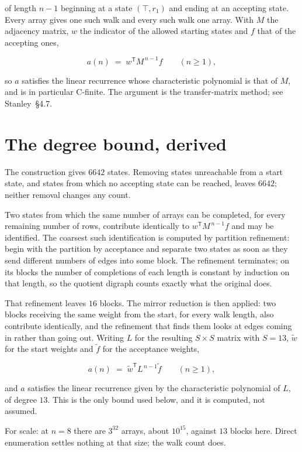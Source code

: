 \documentclass[11pt]{article}
\theoremstyle{definition}
\begin{document}
of length $n-1$ beginning at a state $(\top,r_1)$ and ending at an accepting state. Every array gives one such walk and every such walk one array. With $M$ the adjacency matrix, $w$ the indicator of the allowed starting states and $f$ that of the accepting ones,

\[a(n) \;=\; w^{\mathsf T} M^{\,n-1} f \qquad (n \ge 1),\]

so $a$ satisfies the linear recurrence whose characteristic polynomial is that of $M$, and is in particular C-finite. The argument is the transfer-matrix method; see Stanley~\S4.7.

\section{The degree bound, derived}

The construction gives $6642$ states. Removing states unreachable from a start state, and states from which no accepting state can be reached, leaves $6642$; neither removal changes any count.

Two states from which the same number of arrays can be completed, for every remaining number of rows, contribute identically to $w^{\mathsf T}M^{\,n-1}f$ and may be identified. The coarsest such identification is computed by partition refinement: begin with the partition by acceptance and separate two states as soon as they send different numbers of edges into some block. The refinement terminates; on its blocks the number of completions of each length is constant by induction on that length, so the quotient digraph counts exactly what the original does.

That refinement leaves $16$ blocks. The mirror reduction is then applied: two blocks receiving the same weight from the start, for every walk length, also contribute identically, and the refinement that finds them looks at edges coming in rather than going out. Writing $L$ for the resulting $S \times S$ matrix with $S = 13$, $\tilde w$ for the start weights and $\tilde f$ for the acceptance weights,

\[a(n) \;=\; \tilde w^{\mathsf T} L^{\,n-1} \tilde f \qquad (n \ge 1),\]

and $a$ satisfies the linear recurrence given by the characteristic polynomial of $L$, of degree $13$. This is the only bound used below, and it is computed, not assumed.

For scale: at $n = 8$ there are $3^{32}$ arrays, about $10^{15}$, against $13$ blocks here. Direct enumeration settles nothing at that size; the walk count does.
\end{document}
